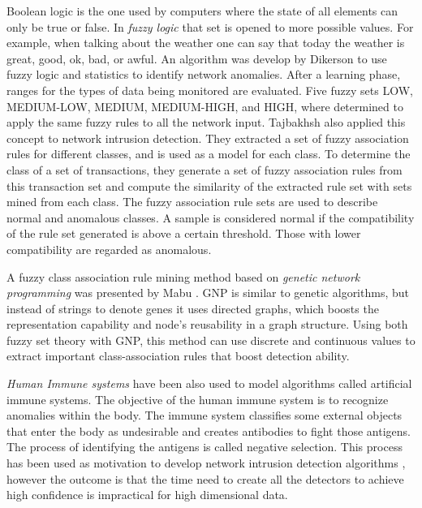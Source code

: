 \begin{itemize}
Boolean logic is the one used by computers where the state of all elements can only be true or false. In \textit{fuzzy logic} that set is opened to more possible values. For example, when talking about the weather one can say that today the weather is great, good, ok, bad, or awful. An algorithm was develop by Dikerson \etAl to use fuzzy logic and statistics to identify network anomalies\cite{877441}. After a learning phase, ranges for the types of data being monitored are evaluated. Five fuzzy sets LOW, MEDIUM-LOW, MEDIUM, MEDIUM-HIGH, and HIGH, where determined to apply the same fuzzy rules to all the network input. Tajbakhsh \etAl also applied this concept to network intrusion detection. They extracted a set of fuzzy association rules for different classes, and is used as a model for each class. To determine the class of a set of transactions, they generate a set of fuzzy association rules from this transaction set and compute the similarity of the extracted rule set with sets mined from each class\cite{Tajbakhsh2009462}. The fuzzy association rule sets are used to describe normal and anomalous classes. A sample is considered normal if the compatibility of the rule set generated is above a certain threshold. Those with lower compatibility are regarded as anomalous.

A fuzzy class association rule mining method based on \textit{genetic network programming} was presented by Mabu \etAl. GNP is similar to genetic algorithms, but instead of strings to denote genes it uses directed graphs, which boosts the representation capability and node's reusability in a graph structure. Using both fuzzy set theory with GNP, this method can use discrete and continuous values to extract important class-association rules that boost detection ability\cite{5499108}.


\textit{Human Immune systems} have been also used to model algorithms called artificial immune systems. The objective of the human immune system is to recognize anomalies within the body. The immune system classifies some external objects that enter the body as undesirable and creates antibodies to fight those antigens. The process of identifying the antigens is called negative selection. This process has been used as motivation to develop network intrusion detection algorithms \cite{ais}, however the outcome is that the time need to create all the detectors to achieve high confidence is impractical for high dimensional data.


%		
%		
%

		
%		
%		
%
%
		
	\end{itemize}


